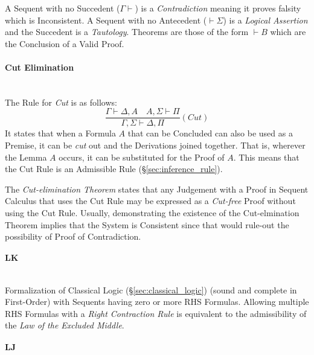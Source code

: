 A Sequent with no Succedent ($\Gamma \vdash$) is a
\emph{Contradiction} meaning it proves falsity which is
Inconsistent. A Sequent with no Antecedent ($\vdash \Sigma$) is a
\emph{Logical Assertion} and the Succedent is a
\emph{Tautology}. Theorems are those of the form $\vdash B$ which are
the Conclusion of a Valid Proof.



\paragraph{Cut Elimination}\label{sec:cut_elimination} \hfill \\

The Rule for \emph{Cut} is as follows:
\[
    \frac{
        \Gamma \vdash \Delta, A \quad A, \Sigma \vdash \Pi
    }{
        \Gamma, \Sigma \vdash \Delta, \Pi
    }(Cut)
\]
It states that when a Formula $A$ that can be Concluded can also be
used as a Premise, it can be \emph{cut} out and the Derivations joined
together. That is, wherever the Lemma $A$ occurs, it can be
substituted for the Proof of $A$. This means that the Cut Rule is an
Admissible Rule (\S\ref{sec:inference_rule}).

The \emph{Cut-elimination Theorem} states that any Judgement with a
Proof in Sequent Calculus that uses the Cut Rule may be expressed as a
\emph{Cut-free} Proof without using the Cut Rule. Usually,
demonstrating the existence of the Cut-elmination Theorem implies that
the System is Consistent since that would rule-out the possibility of
Proof of Contradiction.



\paragraph{$\mathbf{LK}$} \hfill \\

Formalization of Classical Logic (\S\ref{sec:classical_logic})
(sound and complete in First-Order) with Sequents having zero or more
RHS Formulas. Allowing multiple RHS Formulas with a \emph{Right
  Contraction Rule} is equivalent to the admissibility of the
\emph{Law of the Excluded Middle}.



\paragraph{$\mathbf{LJ}$} \hfill \\

